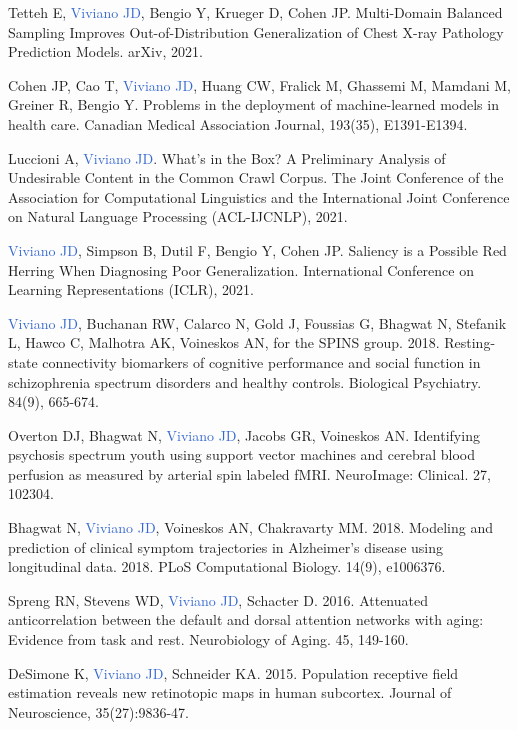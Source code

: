 \documentclass[a4paper,11pt,oneside]{book}
\newcommand\paper[1]{
    #1\\
    \vspace{3.5mm}
}
\begin{document}
\begin{flushleft}
\paper{Tetteh E, \textcolor{highlight}{Viviano JD}, Bengio Y, Krueger D, Cohen JP. Multi-Domain Balanced Sampling Improves Out-of-Distribution Generalization of Chest X-ray Pathology Prediction Models. arXiv, 2021.}

\paper{Cohen JP, Cao T, \textcolor{highlight}{Viviano JD}, Huang CW, Fralick M, Ghassemi M, Mamdani M, Greiner R, Bengio Y. Problems in the deployment of machine-learned models in health care. Canadian Medical Association Journal, 193(35), E1391-E1394.}

\paper{Luccioni A, \textcolor{highlight}{Viviano JD}. What’s in the Box? A Preliminary Analysis of Undesirable Content in the Common Crawl Corpus. The Joint Conference of the Association for Computational Linguistics and the International Joint Conference on Natural Language Processing (ACL-IJCNLP), 2021.}

\paper{\textcolor{highlight}{Viviano JD}, Simpson B, Dutil F, Bengio Y, Cohen JP. Saliency is a Possible Red Herring When Diagnosing Poor Generalization. International Conference on Learning Representations (ICLR), 2021.}

\paper{\textcolor{highlight}{Viviano JD}, Buchanan RW, Calarco N, Gold J, Foussias G, Bhagwat N, Stefanik L, Hawco C, Malhotra AK, Voineskos AN, for the SPINS group. 2018. Resting-state connectivity biomarkers of cognitive performance and social function in schizophrenia spectrum disorders and healthy controls. Biological Psychiatry. 84(9), 665-674.}

\paper{Overton DJ, Bhagwat N, \textcolor{highlight}{Viviano JD}, Jacobs GR, Voineskos AN. Identifying psychosis spectrum youth using support vector machines and cerebral blood perfusion as measured by arterial spin labeled fMRI. NeuroImage: Clinical. 27, 102304.}

\paper{Bhagwat N, \textcolor{highlight}{Viviano JD}, Voineskos AN, Chakravarty MM. 2018. Modeling and prediction of clinical symptom trajectories in Alzheimer's disease using longitudinal data. 2018. PLoS Computational Biology. 14(9), e1006376.}

\paper{Spreng RN, Stevens WD, \textcolor{highlight}{Viviano JD}, Schacter D. 2016. Attenuated anticorrelation between the default and dorsal attention networks with aging: Evidence from task and rest. Neurobiology of Aging. 45, 149-160.}

\paper{DeSimone K, \textcolor{highlight}{Viviano JD}, Schneider KA. 2015. Population receptive field estimation reveals new retinotopic maps in human subcortex. Journal of Neuroscience, 35(27):9836-47.}


\end{flushleft}
\end{document}
